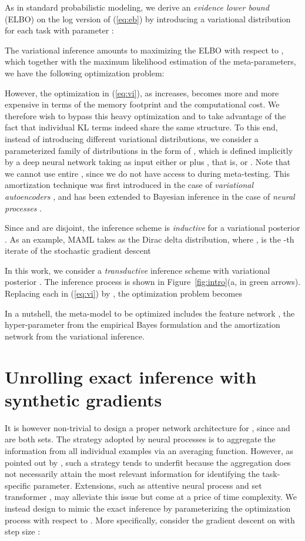 \documentclass{article} \usepackage{iclr2020_conference,times}
\def\eqref#1{(\ref{#1})}
\begin{document}
As in standard probabilistic modeling, 
we derive an \emph{evidence lower bound} (ELBO) on the log version of \eqref{eq:eb}
by introducing a variational distribution  for each task with parameter : 

The variational inference amounts to maximizing the ELBO with respect to , which 
together with the maximum likelihood estimation of the meta-parameters, we have the following optimization problem:

However, the optimization in \eqref{eq:vi}, as  increases, becomes more and more expensive in terms of the memory footprint and the computational cost.
We therefore wish to bypass this heavy optimization
and to take advantage of the fact that
individual KL terms indeed share the same structure.
To this end, instead of introducing  different variational distributions, 
we consider a parameterized family of distributions in the form of , 
which is defined implicitly by a deep neural network  taking as input either  or  plus ,
that is,  or .
Note that we cannot use entire ,
since we do not have access to  during meta-testing.
This amortization technique was first introduced in the case of \emph{variational autoencoders} \citep{kingma2013auto,rezende2014stochastic},
and has been extended to Bayesian inference in the case of \emph{neural processes} \citep{garnelo2018neural}.

Since  and  are disjoint, the inference scheme is \emph{inductive} for a variational posterior .
As an example, MAML \citep{finn2017model} takes  as the Dirac delta distribution,
where , is the -th iterate of the stochastic gradient descent


In this work, we consider a \emph{transductive} inference scheme with variational posterior .
The inference process is shown in Figure~\ref{fig:intro}(a, in green arrows).
Replacing each  in \eqref{eq:vi} by ,
the optimization problem becomes

In a nutshell, the meta-model to be optimized includes the feature network , the hyper-parameter  from the empirical Bayes formulation and the amortization network  from the variational inference.

 \section{Unrolling exact inference with synthetic gradients}
\label{sec:alg}

It is however non-trivial to design a proper network architecture for , since  and  are both sets.
The strategy adopted by neural processes \citep{garnelo2018neural} is to aggregate the information from all individual examples via an averaging function.
However, as pointed out by \citet{kim2019attentive}, such a strategy tends to underfit  
because the aggregation does not necessarily attain the most relevant information for identifying the task-specific parameter.
Extensions, such as attentive neural process \citep{kim2019attentive} and set transformer \citep{lee2019set}, may alleviate this issue but come at a price of  time complexity.
We instead design  to mimic the exact inference 
by parameterizing the optimization process with respect to . More specifically,
consider the gradient descent on  with step size :
\end{document}
